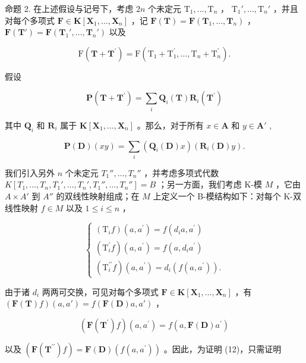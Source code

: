 命题 2. 在上述假设与记号下，考虑 \(2n\) 个未定元 \(\mathrm{T}_1, \ldots, \mathrm{T}_n\) ， \(\mathrm{T}_1', \ldots, \mathrm{T}_n'\) ，并且对每个多项式 \(\mathbf{F} \in \mathbf{K}[\mathbf{X}_1, \ldots, \mathbf{X}_n]\) ，记 \(\mathbf{F}(\mathbf{T}) = \mathbf{F}(\mathbf{T}_1, \ldots, \mathbf{T}_n)\) ， \(\mathbf{F}(\mathbf{T}') = \mathbf{F}(\mathbf{T}_1', \ldots, \mathbf{T}_n')\) 以及

\[
\mathrm{F} (\mathbf {T} + \mathbf {T} ^ {\prime}) = \mathrm{F} (\mathrm{T} _ {1} + \mathrm{T} _ {1} ^ {\prime}, \dots , \mathrm{T} _ {n} + \mathrm{T} _ {n} ^ {\prime}).
\]

假设

\[
\mathbf {P} (\mathbf {T} + \mathbf {T} ^ {\prime}) = \sum_ {i} \mathbf {Q} _ {i} (\mathbf {T}) \mathbf {R} _ {i} (\mathbf {T} ^ {\prime})
\]

其中 \(\mathbf{Q}_i\) 和 \(\mathbf{R}_i\) 属于 \(\mathbf{K}[\mathbf{X}_1,\ldots ,\mathbf{X}_n]\) 。那么，对于所有 \(x\in \mathbf{A}\) 和 \(y\in \mathbf{A}'\) ,

\[
\mathbf {P} (\mathbf {D}) (x y) = \sum_ {i} \left(\mathbf {Q} _ {i} (\mathbf {D}) x\right) (\mathbf {R} _ {i} (\mathbf {D}) y).\tag{12}
\]

我们引入另外 \(n\) 个未定元 \(T_1'', \ldots, T_n''\) ，并考虑多项式代数 \(K[T_1, \ldots, T_n, T_1', \ldots, T_n', T_1'', \ldots, T_n''] = B\) ；另一方面，我们考虑 K-模 \(M\) ，它由 \(A \times A'\) 到 \(A''\) 的双线性映射组成；在 \(M\) 上定义一个 B-模结构如下：对每个 K-双线性映射 \(f \in M\) 以及 \(1 \leqslant i \leqslant n\) ，

\[
\left\{ \begin{array}{l} (\mathrm{T} _ {i} f) (a, a ^ {\prime}) = f (d _ {i} a, a ^ {\prime}) \\ (\mathrm{T} _ {i} ^ {\prime} f) (a, a ^ {\prime}) = f (a, d _ {i} a ^ {\prime}) \\ (\mathrm{T} _ {i} ^ {\prime \prime} f) (a, a ^ {\prime}) = d _ {i} (f (a, a ^ {\prime})). \end{array} \right.\tag{13}
\]

由于诸 \(d_{i}\) 两两可交换，可见对每个多项式 \(\mathbf{F} \in \mathbf{K}[\mathbf{X}_{1}, \ldots, \mathbf{X}_{n}]\) ，有 \((\mathbf{F}(\mathbf{T})f)(a, a') = f(\mathbf{F}(\mathbf{D})a, a')\) ，

\[
(\mathbf {F} (\mathbf {T} ^ {\prime}) f) (a, a ^ {\prime}) = f (a, \mathbf {F} (\mathbf {D}) a ^ {\prime})
\]

以及 \((\mathbf{F}(\mathbf{T}^{\prime \prime})f) = \mathbf{F}(\mathbf{D})(f(a,a^{\prime}))\) 。因此，为证明 (12)，只需证明

